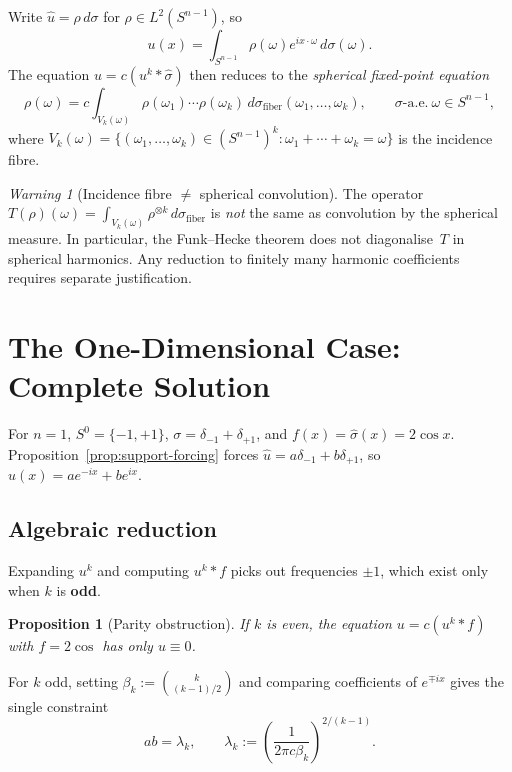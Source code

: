 \documentclass[12pt]{article}
\newtheorem{proposition}[theorem]{Proposition}
\theoremstyle{definition}
\theoremstyle{remark}
\newtheorem{warning}[theorem]{Warning}
\newcommand{\wh}{\widehat}
\begin{document}
Write $\wh u=\rho\,d\sigma$ for $\rho\in L^2(S^{n-1})$, so
\[
  u(x) = \int_{S^{n-1}}\rho(\omega)e^{ix\cdot\omega}\,d\sigma(\omega).
\]
The equation $u=c(u^k\ast\wh\sigma)$ then reduces to the
\emph{spherical fixed-point equation}
\begin{equation}  \label{eq:sphere-eq}
  \rho(\omega) = c\int_{V_k(\omega)}\rho(\omega_1)\cdots\rho(\omega_k)
    \,d\sigma_{\mathrm{fiber}}(\omega_1,\ldots,\omega_k),
  \qquad \sigma\text{-a.e.}\ \omega\in S^{n-1},
\end{equation}
where $V_k(\omega)=\{(\omega_1,\ldots,\omega_k)\in(S^{n-1})^k:
\omega_1+\cdots+\omega_k=\omega\}$ is the incidence fibre.

\begin{warning}[Incidence fibre $\neq$ spherical convolution]
  \label{warn:not-convolution}
  The operator $T(\rho)(\omega)=\int_{V_k(\omega)}\rho^{\otimes k}\,
  d\sigma_\mathrm{fiber}$ is \emph{not} the same as convolution by the
  spherical measure.  In particular, the Funk--Hecke theorem does not
  diagonalise~$T$ in spherical harmonics.  Any reduction to finitely many
  harmonic coefficients requires separate justification.
\end{warning}

\section{The One-Dimensional Case: Complete Solution}
\label{sec:1D}

For $n=1$, $S^0=\{-1,+1\}$, $\sigma=\delta_{-1}+\delta_{+1}$, and
$f(x)=\wh\sigma(x)=2\cos x$.  Proposition~\ref{prop:support-forcing} forces
$\wh u=a\delta_{-1}+b\delta_{+1}$, so $u(x)=ae^{-ix}+be^{ix}$.

\subsection{Algebraic reduction}

Expanding $u^k$ and computing $u^k\ast f$ picks out frequencies
$\pm 1$, which exist only when $k$ is \textbf{odd}.

\begin{proposition}[Parity obstruction]
  If $k$ is even, the equation $u=c(u^k\ast f)$ with $f=2\cos$ has only
  $u\equiv 0$.
\end{proposition}

For $k$ odd, setting $\beta_k:=\binom{k}{(k-1)/2}$ and comparing coefficients
of $e^{\mp ix}$ gives the single constraint
\begin{equation}  \label{eq:constraint}
  ab = \lambda_k,
  \qquad
  \lambda_k := \left(\frac{1}{2\pi c\beta_k}\right)^{2/(k-1)}.
\end{equation}
\end{document}
